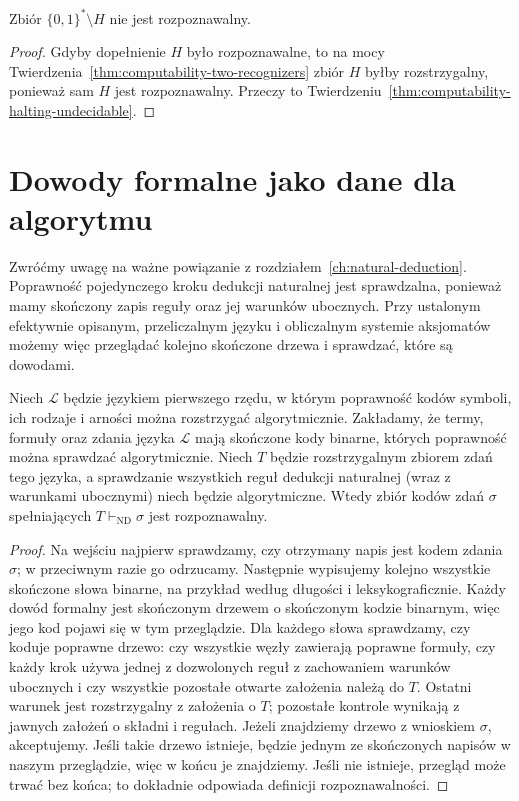 \begin{wniosek}
Zbiór $\{0,1\}^*\setminus H$ nie jest rozpoznawalny.
\end{wniosek}
\begin{proof}
Gdyby dopełnienie $H$ było rozpoznawalne,
to na mocy Twierdzenia~\ref{thm:computability-two-recognizers}
zbiór $H$ byłby rozstrzygalny, ponieważ sam $H$
jest rozpoznawalny. Przeczy to
Twierdzeniu~\ref{thm:computability-halting-undecidable}.
\end{proof}

\section{Dowody formalne jako dane dla algorytmu}
Zwróćmy uwagę na ważne powiązanie z rozdziałem~\ref{ch:natural-deduction}.
Poprawność pojedynczego kroku dedukcji naturalnej
jest sprawdzalna, ponieważ mamy skończony zapis reguły
oraz jej warunków ubocznych. Przy ustalonym efektywnie
opisanym, przeliczalnym języku i obliczalnym systemie aksjomatów
możemy więc przeglądać kolejno skończone drzewa
i sprawdzać, które są dowodami.

\begin{twierdzenie}
\label{thm:computability-proof-recognizable}
Niech $\mathcal L$ będzie językiem pierwszego rzędu,
w którym poprawność kodów symboli, ich rodzaje i arności
można rozstrzygać algorytmicznie. Zakładamy, że termy,
formuły oraz zdania języka $\mathcal L$ mają skończone
kody binarne, których poprawność można sprawdzać
algorytmicznie. Niech $T$ będzie rozstrzygalnym zbiorem zdań
tego języka, a sprawdzanie wszystkich reguł dedukcji naturalnej
(wraz z warunkami ubocznymi) niech będzie algorytmiczne.
Wtedy zbiór kodów zdań $\sigma$ spełniających
$T\vdash_{\mathrm{ND}}\sigma$ jest rozpoznawalny.
\end{twierdzenie}
\begin{proof}
Na wejściu najpierw sprawdzamy, czy otrzymany napis
jest kodem zdania $\sigma$; w przeciwnym razie go odrzucamy.
Następnie wypisujemy kolejno wszystkie skończone słowa
binarne, na przykład według długości i leksykograficznie.
Każdy dowód formalny jest skończonym drzewem o skończonym
kodzie binarnym, więc jego kod pojawi się w tym przeglądzie.
Dla każdego słowa sprawdzamy,
czy koduje poprawne drzewo: czy wszystkie węzły
zawierają poprawne formuły, czy każdy krok używa
jednej z dozwolonych reguł z zachowaniem warunków ubocznych
i czy wszystkie pozostałe otwarte założenia należą do $T$.
Ostatni warunek jest rozstrzygalny z założenia o $T$;
pozostałe kontrole wynikają z jawnych założeń o składni
i regułach.
Jeżeli znajdziemy drzewo z wnioskiem $\sigma$, akceptujemy.
Jeśli takie drzewo istnieje, będzie jednym ze skończonych
napisów w naszym przeglądzie, więc w końcu je znajdziemy.
Jeśli nie istnieje, przegląd może trwać bez końca;
to dokładnie odpowiada definicji rozpoznawalności.
\end{proof}

